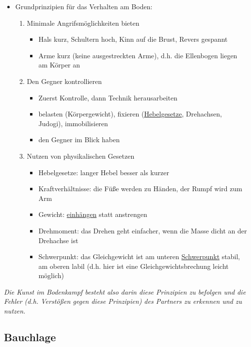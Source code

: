 \documentclass[justified, a4paper, notitlepage, captions=tableheading, nobib]{tufte-handout}
\begin{document}
\begin{itemize}
\item Grundprinzipien für das Verhalten am Boden:
\begin{enumerate}
\item Minimale Angrifsmöglichkeiten bieten
\begin{itemize}
\item Hals kurz, Schultern hoch, Kinn auf die Brust, Revers gespannt
\item Arme kurz (keine ausgestreckten Arme), d.h. die Ellenbogen liegen am Körper an
\end{itemize}
\item Den Gegner kontrollieren
\begin{itemize}
\item Zuerst \label{org62f0267}Kontrolle, dann Technik herausarbeiten
\item \label{orgfd3940e}belasten (Körpergewicht), \label{orga016ab4}fixieren (\hyperref[org8cc1d3f]{Hebelgesetze}, Drehachsen, Judogi), \label{orgdc7a09a}immobilisieren
\item den Gegner im Blick haben
\end{itemize}
\item \label{orgd489b91}Nutzen von physikalischen Gesetzen
\begin{itemize}
\item \label{org8cc1d3f}Hebelgesetze: langer Hebel besser als kurzer
\item \label{orga05c6ff}Kraftverhältnisse: die Füße werden zu Händen, der Rumpf wird zum Arm
\item \label{org177bbff}Gewicht: \hyperref[orgda5cad1]{einhängen} statt anstrengen
\item \label{org1681f7a}Drehmoment: das Drehen geht einfacher, wenn die Masse dicht an der Drehachse ist
\item \label{org6bef098}Schwerpunkt: das Gleichgewicht ist am unteren \hyperref[org6bef098]{Schwerpunkt} stabil, am oberen labil (d.h. hier ist eine \label{org139da72}Gleichgewichtsbrechung leicht möglich)
\end{itemize}
\end{enumerate}
\end{itemize}

\emph{Die Kunst im Bodenkampf besteht also darin diese Prinzipien zu befolgen und die Fehler (d.h. Verstößen gegen diese Prinzipien) des Partners zu erkennen und zu nutzen.}

\newpage
\subsection{\label{orga8ca34f}Bauchlage }
\label{sec:orgfc7104f}
\end{document}
